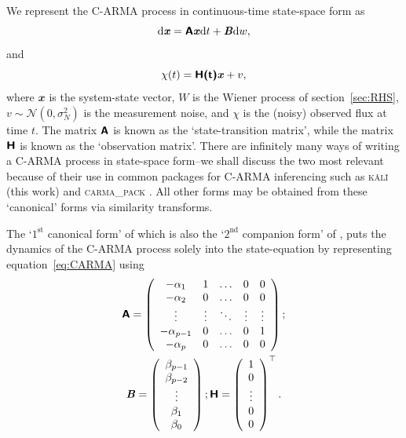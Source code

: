 \documentclass[a4paper,fleqn,usenatbib]{mnras}
\begin{document}
We represent the C-ARMA process in continuous-time state-space form \citep{Wiberg,Friedland} as
\begin{equation}\label{eq:StateEqn}
\mathrm{d}\textbf{\textit{x}} = \textbf{\textsf{A}}\textbf{\textit{x}}\mathrm{d}t + \textbf{\textit{B}}\mathrm{d}w,
\end{equation}
and
\begin{equation}\label{eq:ObsEqn}
\chi(t) = \textbf{\textsf{H(t)}}\textbf{\textit{x}} + v,
\end{equation}
where $\mathbfit{x}$ is the system-state vector, $W$ is the Wiener process of section~\ref{sec:RHS}, $v \sim \mathcal{N}(0,\sigma^{2}_{N})$ is the measurement noise, and $\chi$ is the (noisy) observed flux at time $t$. The matrix $\textbf{\textsf{A}}$ is known as the `state-transition matrix', while the matrix $\textbf{\textsf{H}}$ is known as the `observation matrix'. There are infinitely many ways of writing a C-ARMA process in state-space form--we shall discuss the two most relevant \citep{Denham74,Kailath74} because of their use in common packages for C-ARMA inferencing such as \textsc{k\={a}l\={i}} (this work) and \textsc{carma\_pack} \citep{Kelly14}. All other forms may be obtained from these `canonical' forms via similarity transforms.

The `$1^{\mathrm{st}}$ canonical form' of \citet{Wiberg} which is also the `$2^{\mathrm{nd}}$ companion form' of \citet{Friedland}, puts the dynamics of the C-ARMA process solely into the state-equation by representing equation~\eqref{eq:CARMA} using
\begin{multline}\label{eq:1stCanForm}
\textbf{\textsf{A}} = \left( \begin{array}{ccccc}
-\alpha_{1} & 1 & \hdots & 0 & 0 \\
-\alpha_{2} & 0 & \hdots & 0 & 0 \\
\vdots & \vdots & \ddots & \vdots & \vdots \\
-\alpha_{p-1} & 0 & \hdots & 0 & 1 \\
-\alpha_{p} & 0 & \hdots & 0 & 0 \\
\end{array}\right); \\ \textbf{\textit{B}} = \left( \begin{array}{c} \beta_{p-1} \\ \beta_{p-2} \\ \vdots \\ \beta_{1} \\ \beta_{0} \end{array} \right); \textbf{\textsf{H}} = \left( \begin{array}{c} 1 \\ 0 \\ \vdots \\ 0 \\ 0 \end{array} \right)^{\top}.
\end{multline}
\end{document}
